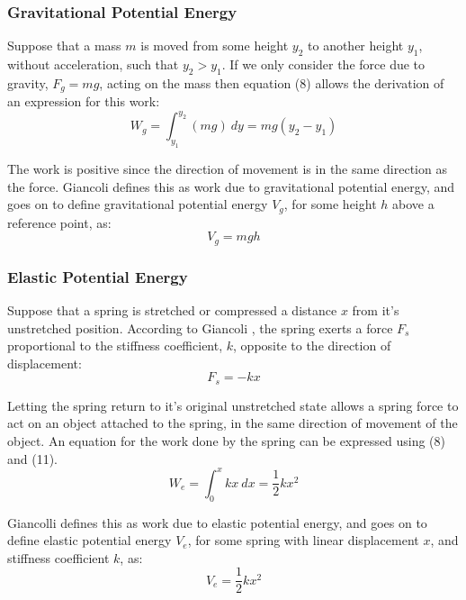 \documentclass[a4paper]{article}
\begin{document}
\subsubsection{Gravitational Potential Energy}
Suppose that a mass $m$ is moved from some height $y_2$ to another height $y_1$, without acceleration, such that $y_2 > y_1$. If we only consider the force due to gravity, $F_g = mg$, acting on the mass then equation (8) allows the derivation of an expression for this work:
\begin{equation}
W_g = \int_{y_1}^{y_2} (mg) \ dy = mg(y_2 - y_1)
\end{equation}

The work is positive since the direction of movement is in the same direction as the force. Giancoli \cite{Giancoli:2000} defines this as work due to gravitational potential energy, and goes on to define gravitational potential energy $V_g$, for some height $h$ above a reference point, as:
\begin{equation}
V_g = mgh
\end{equation}

\subsubsection{Elastic Potential Energy}
Suppose that a spring is stretched or compressed a distance $x$ from it's unstretched position. According to Giancoli \cite{Giancoli:2000}, the spring exerts a force $F_s$ proportional to the stiffness coefficient, $k$, opposite to the direction of displacement:
\begin{equation}
F_s = -kx
\end{equation}

Letting the spring return to it's original unstretched state allows a spring force to act on an object attached to the spring, in the same direction of movement of the object. An equation for the work done by the spring can be expressed using (8) and (11).
\begin{equation}
W_e = \int_{0}^{x} kx \ dx = \frac{1}{2}kx^2
\end{equation}

Giancolli \cite{Giancoli:2000} defines this as work due to elastic potential energy, and goes on to define elastic potential energy $V_e$, for some spring with linear displacement $x$, and stiffness coefficient $k$, as:
\begin{equation}
V_e = \frac{1}{2}kx^2
\end{equation}
\end{document}
